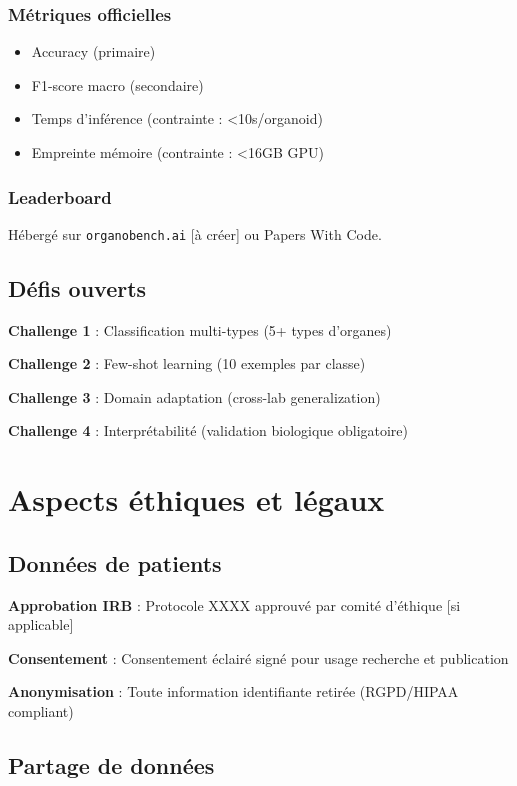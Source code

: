 \subsubsection{Métriques officielles}

\begin{itemize}
    \item Accuracy (primaire)
    \item F1-score macro (secondaire)
    \item Temps d'inférence (contrainte : <10s/organoid)
    \item Empreinte mémoire (contrainte : <16GB GPU)
\end{itemize}

\subsubsection{Leaderboard}

Hébergé sur \texttt{organobench.ai} [à créer] ou Papers With Code.

\subsection{Défis ouverts}

\textbf{Challenge 1} : Classification multi-types (5+ types d'organes)

\textbf{Challenge 2} : Few-shot learning (10 exemples par classe)

\textbf{Challenge 3} : Domain adaptation (cross-lab generalization)

\textbf{Challenge 4} : Interprétabilité (validation biologique obligatoire)

\section{Aspects éthiques et légaux}

\subsection{Données de patients}

\textbf{Approbation IRB} : Protocole XXXX approuvé par comité d'éthique [si applicable]

\textbf{Consentement} : Consentement éclairé signé pour usage recherche et publication

\textbf{Anonymisation} : Toute information identifiante retirée (RGPD/HIPAA compliant)

\subsection{Partage de données}

